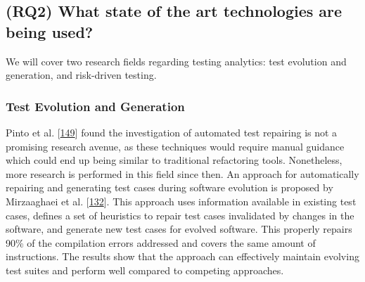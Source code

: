 \documentclass[]{book}
\begin{document}
\subsection{(RQ2) What state of the art technologies are being
used?}\label{rq2-what-state-of-the-art-technologies-are-being-used}

We will cover two research fields regarding testing analytics: test
evolution and generation, and risk-driven testing.

\subsubsection{Test Evolution and
Generation}\label{test-evolution-and-generation}

Pinto et al. {[}\protect\hyperlink{ref-pinto2012understanding}{149}{]}
found the investigation of automated test repairing is not a promising
research avenue, as these techniques would require manual guidance which
could end up being similar to traditional refactoring tools.
Nonetheless, more research is performed in this field since then. An
approach for automatically repairing and generating test cases during
software evolution is proposed by Mirzaaghaei et al.
{[}\protect\hyperlink{ref-supportingtestsuite}{132}{]}. This approach
uses information available in existing test cases, defines a set of
heuristics to repair test cases invalidated by changes in the software,
and generate new test cases for evolved software. This properly repairs
90\% of the compilation errors addressed and covers the same amount of
instructions. The results show that the approach can effectively
maintain evolving test suites and perform well compared to competing
approaches.
\end{document}
